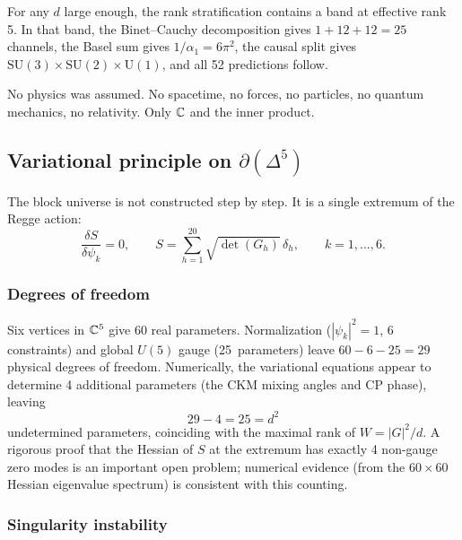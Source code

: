 For any $d$ large enough, the rank stratification contains a band at effective rank 5. In that band, the Binet--Cauchy decomposition gives $1 + 12 + 12 = 25$ channels, the Basel sum gives $1/\alpha_1 = 6\pi^2$, the causal split gives $\text{SU}(3) \times \text{SU}(2) \times \text{U}(1)$, and all 52 predictions follow.

No physics was assumed. No spacetime, no forces, no particles, no quantum mechanics, no relativity. Only $\mathbb{C}$ and the inner product.

\subsection{Variational principle on $\partial(\Delta^5)$}
\label{sec:variational}

The block universe is not constructed step by step.  It is a single extremum of the Regge action:
\begin{equation}
\frac{\delta S}{\delta\psi_k} = 0, \qquad S = \sum_{h=1}^{20} \sqrt{\det(G_h)}\,\delta_h, \qquad k = 1,\ldots,6.
\end{equation}

\subsubsection{Degrees of freedom}

Six vertices in $\mathbb{C}^5$ give $60$ real parameters.  Normalization ($|{\psi_k}|^2 = 1$, 6 constraints) and global $U(5)$ gauge (25~parameters) leave $60 - 6 - 25 = 29$ physical degrees of freedom.  Numerically, the variational equations appear to determine 4 additional parameters (the CKM mixing angles and CP phase), leaving
\begin{equation}
29 - 4 = 25 = d^2
\end{equation}
undetermined parameters, coinciding with the maximal rank of $W = |G|^2/d$.  A rigorous proof that the Hessian of $S$ at the extremum has exactly 4 non-gauge zero modes is an important open problem; numerical evidence (from the $60\times60$ Hessian eigenvalue spectrum) is consistent with this counting.

\subsubsection{Singularity instability}

